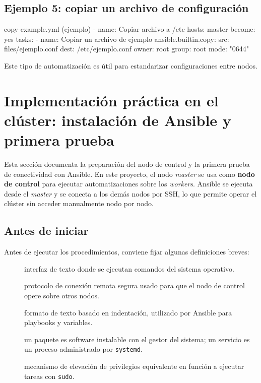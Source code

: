 \subsection{Ejemplo 5: copiar un archivo de configuración}
\label{subsec:ansible_ej5_copy}

\begin{yamlcode}
copy-example.yml (ejemplo)
- name: Copiar archivo a /etc
  hosts: master
  become: yes
  tasks:
    - name: Copiar un archivo de ejemplo
      ansible.builtin.copy:
        src: files/ejemplo.conf
        dest: /etc/ejemplo.conf
        owner: root
        group: root
        mode: "0644"
\end{yamlcode}

Este tipo de automatización es útil para estandarizar configuraciones entre nodos.

\section{Implementación práctica en el clúster: instalación de Ansible y primera prueba}
\label{sec:ansible_practica_instalacion_ping}

Esta sección documenta la preparación del nodo de control y la primera prueba de conectividad con Ansible. En este proyecto, el nodo \textit{master} se usa como \textbf{nodo de control} para ejecutar automatizaciones sobre los \textit{workers}. Ansible se ejecuta desde el \textit{master} y se conecta a los demás nodos por SSH, lo que permite operar el clúster sin acceder manualmente nodo por nodo. \cite{ansible_installation_distros,ansible_connection_details}

\subsection{Antes de iniciar}
\label{subsec:ansible_antes_de_iniciar}

Antes de ejecutar los procedimientos, conviene fijar algunas definiciones breves:
\begin{description}
  \item[] interfaz de texto donde se ejecutan comandos del sistema operativo.
  \item[] protocolo de conexión remota segura usado para que el nodo de control opere sobre otros nodos.
  \item[] formato de texto basado en indentación, utilizado por Ansible para playbooks y variables.
  \item[] un paquete es software instalable con el gestor del sistema; un servicio es un proceso administrado por \texttt{systemd}.
  \item[] mecanismo de elevación de privilegios equivalente en función a ejecutar tareas con \texttt{sudo}.
\end{description}

